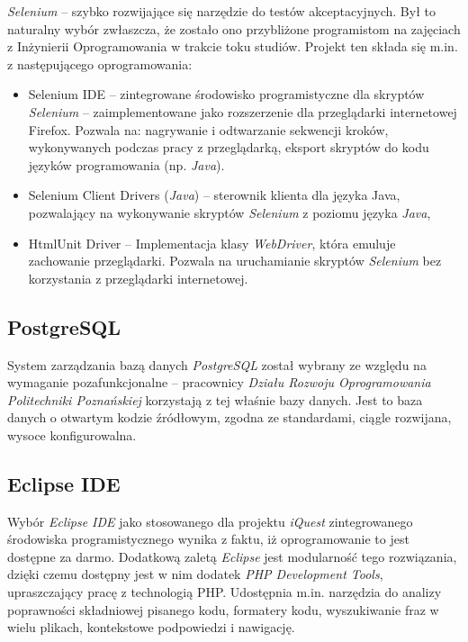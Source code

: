 \emph{Selenium} -- szybko rozwijające się narzędzie do testów akceptacyjnych. Był to naturalny wybór zwłaszcza, że zostało ono przybliżone programistom na zajęciach z Inżynierii Oprogramowania w trakcie toku studiów. Projekt ten składa się m.in. z następującego oprogramowania:
\begin{itemize}
\item{Selenium IDE -- zintegrowane środowisko programistyczne dla skryptów \emph{Selenium} -- zaimplementowane jako rozszerzenie dla przeglądarki internetowej Firefox. Pozwala na: nagrywanie i odtwarzanie sekwencji kroków, wykonywanych podczas pracy z przeglądarką, eksport skryptów do kodu języków programowania (np. \emph{Java}).}
\item{Selenium Client Drivers (\emph{Java}) -- sterownik klienta dla języka Java, pozwalający na wykonywanie skryptów \emph{Selenium} z poziomu języka \emph{Java}},
\item{HtmlUnit Driver -- Implementacja klasy \emph{WebDriver}, która emuluje zachowanie przeglądarki. Pozwala na uruchamianie skryptów \emph{Selenium} bez korzystania z przeglądarki internetowej.}
\end{itemize}

\subsection{PostgreSQL}
\label{Chapter635}

System zarządzania bazą danych \emph{PostgreSQL} został wybrany ze względu na wymaganie pozafunkcjonalne -- pracownicy \emph{Działu Rozwoju Oprogramowania Politechniki Poznańskiej} korzystają z tej właśnie bazy danych. Jest to baza danych o otwartym kodzie źródłowym, zgodna ze standardami, ciągle rozwijana, wysoce konfigurowalna.

\subsection{Eclipse IDE}
\label{Chapter636}

Wybór \emph{Eclipse IDE} jako stosowanego dla projektu \textit{iQuest} zintegrowanego środowiska programistycznego wynika z faktu, iż oprogramowanie to jest dostępne za darmo. Dodatkową zaletą \textit{Eclipse} jest modularność tego rozwiązania, dzięki czemu dostępny jest w nim dodatek \emph{PHP Development Tools}, upraszczający pracę z technologią PHP. Udostępnia m.in. narzędzia do analizy poprawności składniowej pisanego kodu, formatery kodu, wyszukiwanie fraz w wielu plikach, kontekstowe podpowiedzi i nawigację.

